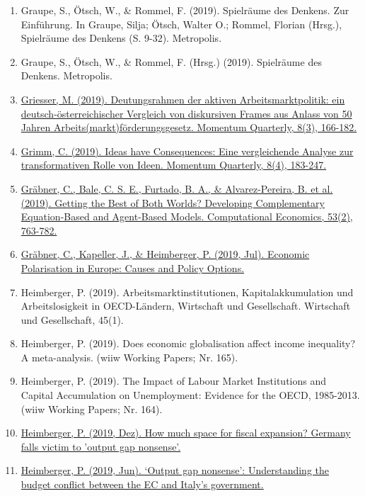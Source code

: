 \begin{enumerate}
	 \item Graupe, S., Ötsch, W., \& Rommel, F. (2019). Spielräume des Denkens. Zur Einführung. In Graupe, Silja; Ötsch, Walter O.; Rommel, Florian (Hrsg.), Spielräume des Denkens (S. 9-32). Metropolis.
	 \item Graupe, S., Ötsch, W., \& Rommel, F. (Hrsg.) (2019). Spielräume des Denkens. Metropolis.
	 \item \href{https://doi.org/10.15203/momentumquarterly.vol8.no3.p166-182}{Griesser, M. (2019). Deutungsrahmen der aktiven Arbeitsmarktpolitik: ein deutsch-österreichischer Vergleich von diskursiven Frames aus Anlass von 50 Jahren Arbeits(markt)förderungsgesetz. Momentum Quarterly, 8(3), 166-182.}
	 \item \href{https://doi.org/10.15203/momentumquarterly.vol8.no4.p215-229}{Grimm, C. (2019). Ideas have Consequences: Eine vergleichende Analyse zur transformativen Rolle von Ideen. Momentum Quarterly, 8(4), 183-247.}
	 \item \href{https://doi.org/10.1007/s10614-017-9763-8}{Gräbner, C., Bale, C. S. E., Furtado, B. A., \& Alvarez-Pereira, B. et al. (2019). Getting the Best of Both Worlds? Developing Complementary Equation-Based and Agent-Based Models. Computational Economics, 53(2), 763-782.}
	 \item \href{https://wiiw.ac.at/economic-polarisation-in-europe-causes-and-options-for-action-dlp-5022.pdf}{Gräbner, C., Kapeller, J., \& Heimberger, P. (2019, Jul). Economic Polarisation in Europe: Causes and Policy Options.}
	 \item Heimberger, P. (2019). Arbeitsmarktinstitutionen, Kapitalakkumulation und Arbeitslosigkeit in OECD-Ländern, Wirtschaft und Gesellschaft. Wirtschaft und Gesellschaft, 45(1).
	 \item Heimberger, P. (2019). Does economic globalisation affect income inequality? A meta-analysis. (wiiw Working Papers; Nr. 165).
	 \item Heimberger, P. (2019). The Impact of Labour Market Institutions and Capital Accumulation on Unemployment: Evidence for the OECD, 1985-2013. (wiiw Working Papers; Nr. 164).
	 \item \href{https://wiiw.ac.at/how-much-space-for-fiscal-expansion-germany-falls-victim-to-output-gap-nonsense-n-412.html}{Heimberger, P. (2019, Dez). How much space for fiscal expansion? Germany falls victim to 'output gap nonsense’.}
	 \item \href{https://wiiw.ac.at/output-gap-nonsense-understanding-budget-conflict-ec-italy-government-n-386.html}{Heimberger, P. (2019, Jun). ‘Output gap nonsense': Understanding the budget conflict between the EC and Italy’s government.}

\end{enumerate}

